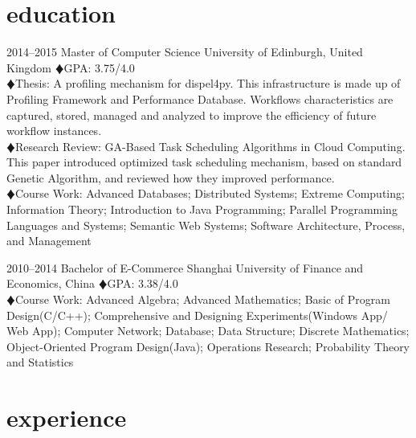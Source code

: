\documentclass[]{friggeri-cv} %
\begin{document}
\section{education}

\begin{entrylist}
\entry
{2014--2015}
{Master {\normalfont of Computer Science}}
{University of Edinburgh, United Kingdom}
{
{\color{red} $\vardiamondsuit$}GPA: 3.75/4.0\\
{\color{red} $\vardiamondsuit$}Thesis: A profiling mechanism for dispel4py. This infrastructure is made up of Profiling Framework and Performance Database. Workflows characteristics are captured, stored, managed and analyzed to improve the efficiency of future workflow instances. \\
{\color{red} $\vardiamondsuit$}Research Review: GA-Based Task Scheduling Algorithms in Cloud Computing. This paper introduced optimized task scheduling mechanism, based on standard Genetic Algorithm, and reviewed how they improved performance. \\
{\color{red} $\vardiamondsuit$}Course Work: Advanced Databases; Distributed Systems; Extreme Computing; Information Theory; Introduction to Java Programming; Parallel Programming Languages and Systems; Semantic Web Systems; Software Architecture, Process, and Management
}

\entry
{2010--2014}
{Bachelor {\normalfont of E-Commerce}}
{Shanghai University of Finance and Economics, China}
{
{\color{red} $\vardiamondsuit$}GPA: 3.38/4.0\\
{\color{red} $\vardiamondsuit$}Course Work:
Advanced Algebra; Advanced Mathematics; Basic of Program Design(C/C++); Comprehensive and Designing Experiments(Windows App/ Web App); Computer Network; Database; Data Structure; Discrete Mathematics; Object-Oriented Program Design(Java); Operations Research; Probability Theory and Statistics
}
\end{entrylist}


\section{experience}
\end{document}
